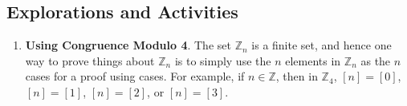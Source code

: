 \subsection*{Explorations and Activities}
\setcounter{oldenumi}{\theenumi}
\begin{enumerate} \setcounter{enumi}{\theoldenumi} 
%
%
%
%
%
%
%
%
%
%


\item \textbf{Using Congruence Modulo 4}.  \label{exer:usingcongruencemod4}
The set  $\mathbb{Z}_n $ is a finite set, and hence one way to prove things about  $\mathbb{Z}_n $
is to simply use the  $n$  elements in  $\mathbb{Z}_n $ as the  $n$  cases for a proof using cases.   For example, if  $n \in \mathbb{Z}$, then in  $\mathbb{Z}_4 $, 
$[ n ] = [ 0 ]$, $[ n ] = [ 1 ]$, 
$[ n ] = [ 2 ]$, or $[ n ] = [ 3 ]$.


\end{enumerate}
